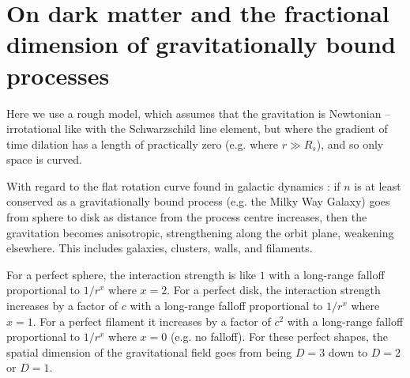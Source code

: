 \documentclass[12pt]{article}
\begin{document}
\section{On dark matter and the fractional dimension of gravitationally bound processes}

Here we use a rough model, which assumes that the gravitation is Newtonian -- irrotational like with the Schwarzschild line element, but where the gradient of time dilation has a length of practically zero (e.g. where $r \gg R_s$), and so only space is curved.

With regard to the flat rotation curve found in galactic dynamics \cite{binney}: if $n$ is at least conserved as a gravitationally bound process (e.g. the Milky Way Galaxy) goes from sphere to disk as distance from the process centre increases, then the gravitation becomes anisotropic, strengthening along the orbit plane, weakening elsewhere.
This includes galaxies, clusters, walls, and filaments.

For a perfect sphere, the interaction strength is like $1$ with a long-range falloff proportional to $1/r^x$ where $x = 2$.
For a perfect disk, the interaction strength increases by a factor of $c$ with a long-range falloff proportional to $1/r^x$ where $x = 1$.
For a perfect filament it increases by a factor of $c^2$ with a long-range falloff proportional to $1/r^x$ where $x = 0$ (e.g. no falloff).
For these perfect shapes, the spatial dimension of the gravitational field goes from being $D = 3$ down to $D = 2$ or $D = 1$.
\end{document}
